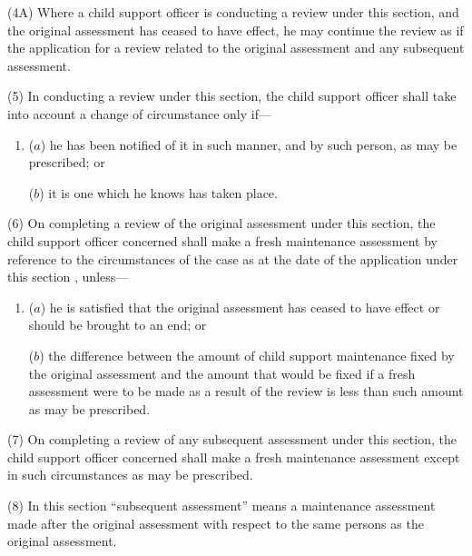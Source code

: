 \documentclass[12pt,a4paper]{article}
\begin{document}
(4A) Where a child support officer is conducting a review under this section, and the original assessment has ceased to have effect, he may continue the review as if the application for a review related to the original assessment and any subsequent assessment.


(5) In conducting a review under this section, the child support officer shall take into account a change of circumstance only if—
\begin{enumerate}\item[]
($a$) he has been notified of it in such manner, and by such person, as may be prescribed; or

($b$) it is one which he knows has taken place.
\end{enumerate}

(6) On completing 
a review of the original assessment  %
under this section, the child support officer concerned shall make a fresh maintenance assessment
by reference to the circumstances of the case as at the date of the application under this section%
, unless—
\begin{enumerate}\item[]
($a$) he is satisfied that the original assessment has ceased to have effect or should be brought to an end; or

($b$) the difference between the amount of child support maintenance fixed by the original assessment and the amount that would be fixed if a fresh assessment were to be made as a result of the review is less than such amount as may be prescribed.
\end{enumerate}

(7) On completing a review of any subsequent assessment under this section, the child support officer concerned shall make a fresh maintenance assessment except in such circumstances as may be prescribed.

(8) In this section “subsequent assessment” means a maintenance assessment made after the original assessment with respect to the same persons as the original assessment.
\end{document}
